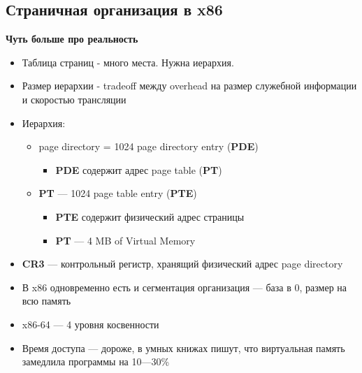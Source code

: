 \documentclass[../../lectures.tex]{subfiles}
\begin{document}
\subsection{Страничная организация в x86}
\textbf{Чуть больше про реальность}
\begin{itemize}
    \item Таблица страниц - много места. Нужна иерархия.
    \item Размер иерархии - tradeoff между overhead на размер служебной информации и скоростью трансляции
    \item Иерархия:
          \begin{itemize}
              \item page directory = 1024 page directory entry (\textbf{PDE})
                    \begin{itemize}
                        \item \textbf{PDE} содержит адрес page table (\textbf{PT})
                    \end{itemize}
              \item \textbf{PT} --- 1024 page table entry (\textbf{PTE})
                    \begin{itemize}
                        \item \textbf{PTE} содержит физический адрес страницы
                        \item \textbf{PT} --- 4 MB of Virtual Memory
                    \end{itemize}
          \end{itemize}
    \item \textbf{CR3} --- контрольный регистр, хранящий физический адрес page directory
    \item В x86 одновременно есть и сегментация организация --- база в 0, размер на всю память
    \item x86-64 --- 4 уровня косвенности
    \item Время доступа --- дороже, в умных книжах пишут, что виртуальная память замедлила программы на 10---30\%
\end{itemize}
\end{document}
